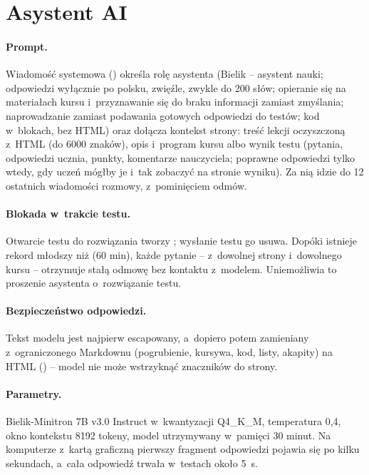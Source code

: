 \section{Asystent AI}

\paragraph{Prompt.} Wiadomość systemowa () określa rolę
asystenta (Bielik -- asystent nauki; odpowiedzi wyłącznie po polsku, zwięźle, zwykle do
200 słów; opieranie się na materiałach kursu i~przyznawanie się do braku informacji zamiast
zmyślania; naprowadzanie zamiast podawania gotowych odpowiedzi do testów; kod w~blokach,
bez HTML) oraz dołącza kontekst strony: treść lekcji oczyszczoną z~HTML (do 6000
znaków), opis i~program kursu albo wynik testu (pytania, odpowiedzi ucznia, punkty,
komentarze nauczyciela; poprawne odpowiedzi tylko wtedy, gdy uczeń mógłby je i~tak
zobaczyć na stronie wyniku). Za nią idzie do 12 ostatnich wiadomości rozmowy, z~pominięciem
odmów.

\paragraph{Blokada w~trakcie testu.} Otwarcie testu do rozwiązania tworzy
; wysłanie testu go usuwa. Dopóki istnieje rekord młodszy niż
 (60 min), każde pytanie -- z~dowolnej strony
i~dowolnego kursu -- otrzymuje stałą odmowę bez kontaktu z~modelem. Uniemożliwia to
proszenie asystenta o~rozwiązanie testu.

\paragraph{Bezpieczeństwo odpowiedzi.} Tekst modelu jest najpierw escapowany, a~dopiero
potem zamieniany z~ograniczonego Markdownu (pogrubienie, kursywa, kod, listy, akapity) na
HTML () -- model nie może wstrzyknąć znaczników do strony.

\paragraph{Parametry.} Bielik-Minitron 7B v3.0 Instruct w~kwantyzacji Q4\_K\_M,
temperatura 0,4, okno kontekstu 8192 tokeny, model utrzymywany w~pamięci 30 minut. Na
komputerze z~kartą graficzną pierwszy fragment odpowiedzi pojawia się po kilku sekundach,
a~cała odpowiedź trwała w~testach około 5~s.

